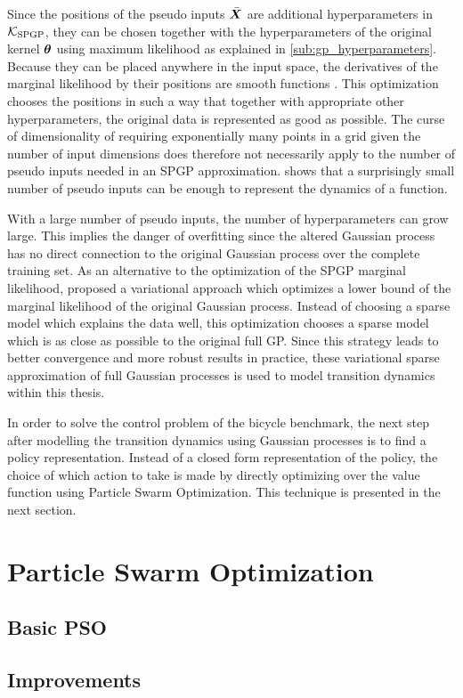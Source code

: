 Since the positions of the pseudo inputs $\bar{\bm{X}}$ are additional hyperparameters in $\operatorname{\mathcal{K}}_{\text{SPGP}}$, they can be chosen together with the hyperparameters of the original kernel $\bm{\theta}$ using maximum likelihood as explained in \cref{sub:gp_hyperparameters}.
Because they can be placed anywhere in the input space, the derivatives of the marginal likelihood by their positions are smooth functions \cite{snelson_sparse_2005}.
This optimization chooses the positions in such a way that together with appropriate other hyperparameters, the original data is represented as good as possible.
The curse of dimensionality of requiring exponentially many points in a grid given the number of input dimensions does therefore not necessarily apply to the number of pseudo inputs needed in an SPGP approximation.
 shows that a surprisingly small number of pseudo inputs can be enough to represent the dynamics of a function.

With a large number of pseudo inputs, the number of hyperparameters can grow large.
This implies the danger of overfitting since the altered Gaussian process has no direct connection to the original Gaussian process over the complete training set.
As an alternative to the optimization of the SPGP marginal likelihood, \citeauthor{titsias_variational_2009} proposed a variational approach \cite{titsias_variational_2009} which optimizes a lower bound of the marginal likelihood of the original Gaussian process.
Instead of choosing a sparse model which explains the data well, this optimization chooses a sparse model which is as close as possible to the original full GP.
Since this strategy leads to better convergence and more robust results in practice, these variational sparse approximation of full Gaussian processes is used to model transition dynamics within this thesis.

In order to solve the control problem of the bicycle benchmark, the next step after modelling the transition dynamics using Gaussian processes is to find a policy representation.
Instead of a closed form representation of the policy, the choice of which action to take is made by directly optimizing over the value function using Particle Swarm Optimization.
This technique is presented in the next section.

\section{Particle Swarm Optimization}
\subsection{Basic PSO}
\subsection{Improvements}

